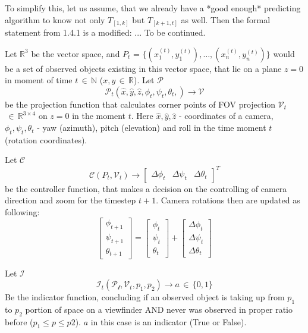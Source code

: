 To simplify this, let us assume, that we already have a *good enough* predicting algorithm to know not only $T_{[1,k]}$ but $T_{[k+1, t]}$ as well. Then the formal statement from 1.4.1 is a modified:
... To be continued.

\fi %

Let $\mathbb{R}^{3}$ be the vector space, and $P_{t}$ = $\{ (x_{1}^{(t)},y_{1}^{(t)}), \dots, (x_{n}^{(t)},y_{n}^{(t)}) \}$ would be a set of observed objects existing in this vector space, that lie on a plane $z=0$ in moment of time $t \, \in \, \mathbb{N}$ ($x,y \, \in \, \mathbb{R}$). Let $\mathcal{P}$
$$\mathcal{P}_{t}(\hat{x}, \hat{y}, \hat{z}, \phi_{t}, \psi_{t}, \theta_{t},) \to \mathcal{V}$$
be the projection function that calculates corner points of FOV projection $\mathcal{V}_{t}$ $\, \in \, \mathbb{R}^{{3\times4}}$ on $z=0$ in the moment $t$. Here $\hat{x}, \hat{y}, \hat{z}$ - coordinates of a camera, $\phi_{t}, \psi_{t}, \theta_{t}$ - yaw (azimuth), pitch (elevation)  and roll in the time moment $t$ (rotation coordinates).

Let $\mathcal{C}$
$$
\mathcal{C}(P_{t}, \mathcal{V}_{t}) \to \begin{bmatrix}
\Delta\phi_{t}  &  \Delta\psi_{t}  &  \Delta\theta_{t} 
\end{bmatrix}^{T}
$$
be the controller function, that makes a decision on the controlling of camera direction and zoom for the timestep $t+1$.  Camera rotations then are updated as following:
$$
\begin{bmatrix}
\phi_{t+1}   \\
 \psi_{t+1} \\
  \theta_{t+1} 
\end{bmatrix} = 
\begin{bmatrix}
\phi_{t}   \\
 \psi_{t} \\
  \theta_{t}
\end{bmatrix} + 
\begin{bmatrix}
\Delta\phi_{t}  \\
 \Delta\psi_{t}  \\
 \Delta\theta _{t}
\end{bmatrix}
$$

Let $\mathcal{I}$ 
$$
\mathcal{I}_{t}(\mathcal{P_{t}}, \mathcal{V}_{t}, p_{1}, p_{2}) \to a \, \in \, \{ 0,1 \}
$$
Be the indicator function, concluding if an observed object is taking up from $p_{1}$ to $p_{2}$ portion of space on a viewfinder AND never was observed in proper ratio before ($p_{1} \leq p \leq p2$). $a$ in this case is an indicator (True or False).

